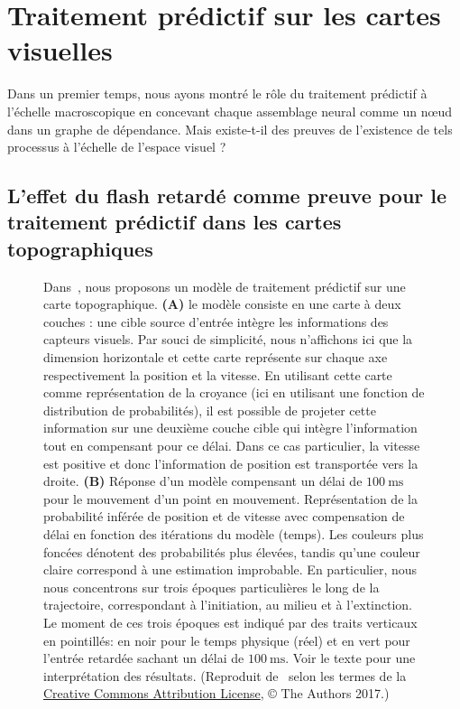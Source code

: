 \documentclass[11pt,french,a4paper,oneside]{article}%
\newcommand{\ms}{\si{\milli\second}}%
\begin{document}
\section{Traitement prédictif sur les cartes visuelles}
\label{sec:maps}
Dans un premier temps, nous ayons montré le rôle du traitement prédictif à l'échelle
macroscopique en concevant chaque assemblage neural comme un nœud dans
un graphe de dépendance. Mais existe-t-il des preuves de l'existence de tels
processus à l'échelle de l'espace visuel ?

\subsection{L'effet du flash retardé comme preuve pour le traitement
prédictif dans les cartes
topographiques}
\begin{figure}%
\caption{
Dans~\citep{KhoeiMassonPerrinet17}, nous proposons un
modèle de traitement prédictif sur une carte topographique. \textbf{(A)}
le modèle consiste en une carte à deux couches : une cible source
d'entrée intègre les informations des capteurs visuels. Par souci de
simplicité, nous n'affichons ici que la dimension horizontale et cette
carte représente sur chaque axe respectivement la position et la
vitesse. En utilisant cette carte comme représentation de la croyance
(ici en utilisant une fonction de distribution de probabilités), il est
possible de projeter cette information sur une deuxième couche cible qui
intègre l'information tout en compensant pour ce délai. Dans
ce cas particulier, la vitesse est positive et donc l'information de
position est transportée vers la droite. \textbf{(B)} Réponse d'un
modèle compensant un délai de $100~\ms$ pour le mouvement d'un point en mouvement.
Représentation de la probabilité inférée de position et de vitesse avec
compensation de délai en fonction des itérations du modèle (temps). Les
couleurs plus foncées dénotent des probabilités plus élevées, tandis
qu'une couleur claire correspond à une estimation improbable. En
particulier, nous nous concentrons sur trois époques particulières le
long de la trajectoire, correspondant à l'initiation, au milieu et à l'extinction.
Le moment de ces trois époques est indiqué par des traits
verticaux en pointillés: en noir pour le temps physique (réel) et en
vert pour l'entrée retardée sachant un délai de $100~\ms$. Voir le texte
pour une interprétation des résultats. (Reproduit de~\citep{KhoeiMassonPerrinet17} selon les termes de la
\href{https://journals.plos.org/ploscompbiol/article?id=10.1371/journal.pcbi.1005068}{Creative
Commons Attribution License}, © The Authors 2017.)
}
\label{fig:KhoeiMassonPerrinet17}
\end{figure}
\end{document}
